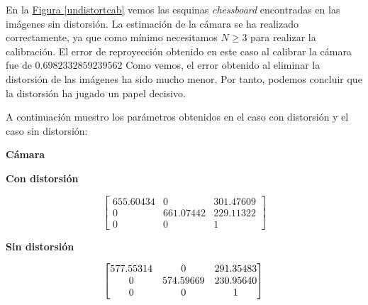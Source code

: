\documentclass[11pt,a4paper]{article}
\theoremstyle{plain}
\theoremstyle{definition}
\begin{document}
En la \hyperref[undistortcab]{Figura \ref*{undistortcab}} vemos las esquinas \textit{chessboard} encontradas en las imágenes sin distorsión. La estimación de la cámara se ha realizado correctamente, ya que como mínimo necesitamos $N \geq 3$ para realizar la calibración. El error de reproyección obtenido en este caso al calibrar la cámara fue de $0.6982332859239562$  Como vemos, el error obtenido al eliminar la distorsión de las imágenes ha sido mucho menor. Por tanto, podemos concluir que la distorsión ha jugado un papel decisivo.

\newpage
A continuación muestro los parámetros obtenidos en el caso con distorsión y el caso sin distorsión:

\begin{center}
    {\LARGE \textbf{Cámara}}
\end{center}
\begin{minipage}{0.5\textwidth}
\begin{center}
{\Large \textbf{Con distorsión}}
\end{center}
\begin{displaymath}
\left[
\begin{matrix}
655.60434 &   0 &         301.47609 \\
  0 &         661.07442 & 229.11322 \\
  0 &           0 &           1   
\end{matrix}
\right] 
\end{displaymath}
\end{minipage}
\begin{minipage}{0.5\textwidth}
\begin{center}
{\Large \textbf{Sin distorsión}}
\end{center}
\begin{displaymath}
\left[
\begin{matrix}
577.55314 &    0 &         291.35483 \\
  0 &          574.59669 & 230.95640 \\
  0 &            0 &           1
\end{matrix}
\right] \\
\end{displaymath}
\end{minipage}
\end{document}
